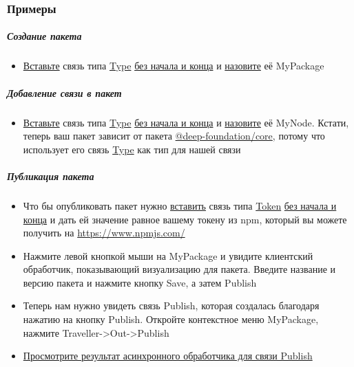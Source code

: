 \subsubsection{Примеры}
\subparagraph{Создание пакета}
\begin{itemize}
      \item \hyperlink{DeepCase.InsertLink.Description}{Вставьте} связь типа
            \hyperlink{Core.Package.Description}{Type}
            \hyperlink{FAQ.HowToInsertLinkWithoutFromAndTo}{без начала и конца}
            и
            \hyperlink{FAQ.HowToSetName}{назовите} её MyPackage
\end{itemize}
\subparagraph{Добавление связи в пакет}
\begin{itemize}
      \item \hyperlink{DeepCase.InsertLink.Description}{Вставьте} связь типа
            \hyperlink{Core.Package.Description}{Type}
            \hyperlink{FAQ.HowToInsertLinkWithoutFromAndTo}{без начала и конца}
            и
            \hyperlink{FAQ.HowToSetName}{назовите} её MyNode. Кстати, теперь
            ваш
            пакет
            зависит от пакета
            \hyperlink{Core.Description}{@deep-foundation/core},
            потому что
            использует его связь \hyperlink{Core.Type.Description}{Type} как
            тип
            для нашей связи
\end{itemize}
\subparagraph{Публикация пакета}
\begin{itemize}
      \item Что бы опубликовать пакет нужно
            \hyperlink{DeepCase.InsertLink.Description}{вставить} связь типа
            \hyperlink{NpmPackager.Token.Description}{Token}
            \hyperlink{FAQ.HowToInsertLinkWithoutFromAndTo}{без начала и конца}
            и
            дать ей
            значение равное вашему токену из npm, который вы можете получить на
            \url{https://www.npmjs.com/}
      \item Нажмите левой кнопкой мыши на MyPackage и увидите клиентский
            обработчик, показывающий визуализацию для пакета. Введите название
            и
            версию
            пакета и нажмите кнопку Save, а затем Publish
      \item Теперь нам нужно увидеть связь Publish, которая создалась благодаря
            нажатию на кнопку Publish. Откройте контекстное меню MyPackage,
            нажмите
            Traveller->Out->Publish
      \item \hyperlink{Handlers.Async.HowToGetResult}{Просмотрите результат
                  асинхронного обработчика для связи Publish}
\end{itemize}

